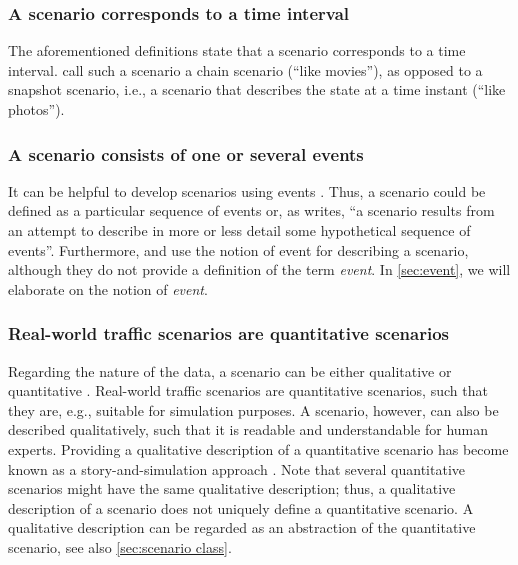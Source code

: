 \subsubsection{A scenario corresponds to a time interval}
The aforementioned definitions \cite{go2004blind, geyer2014, ulbrich2015, elrofai2016scenario} state that a scenario corresponds to a time interval. \textcite{vannotten2003updated} call such a scenario a chain scenario (``like movies''), as opposed to a snapshot scenario, i.e., a scenario that describes the state at a time instant (``like photos''). %

\subsubsection{A scenario consists of one or several events \cite{vannotten2003updated, go2004blind, geyer2014, ulbrich2015, kahn1962, englund2016grand, schoemaker1993multiple, cuppens2002alert, bach2016modelbased}}
It can be helpful to develop scenarios using events \cite{bishop2007scentechniques}. Thus, a scenario could be defined as a particular sequence of events or, as \textcite[p.~143]{kahn1962} writes, ``a scenario results from an attempt to describe in more or less detail some hypothetical sequence of events''. Furthermore, \textcite{geyer2014} and \textcite{ulbrich2015} use the notion of event for describing a scenario, although they do not provide a definition of the term \emph{event}. In \cref{sec:event}, we will elaborate on the notion of \emph{event}.

\subsubsection{Real-world traffic scenarios are quantitative scenarios}
Regarding the nature of the data, a scenario can be either qualitative or quantitative \cite{vannotten2003updated}. Real-world traffic scenarios are quantitative scenarios, such that they are, e.g., suitable for simulation purposes. A scenario, however, can also be described qualitatively, such that it is readable and understandable for human experts. Providing a qualitative description of a quantitative scenario has become known as a story-and-simulation approach \cite{alcamo2001scenarios}. 
Note that several quantitative scenarios might have the same qualitative description; thus, a qualitative description of a scenario does not uniquely define a quantitative scenario. A qualitative description can be regarded as an abstraction of the quantitative scenario, see also \cref{sec:scenario class}.

